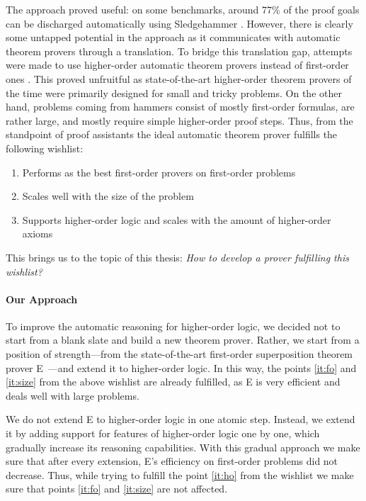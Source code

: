 The approach proved useful: on some benchmarks, around 77\% of the proof goals can be
discharged automatically using Sledgehammer \cite{bgkku-16-larning-fact-selector}. However, there is
clearly some untapped potential in the approach as it communicates with
automatic theorem provers through a translation. To bridge this translation gap,
attempts were made to use higher-order automatic theorem provers instead of
first-order ones \cite{ns-13-leo2sh}. This proved unfruitful as state-of-the-art
higher-order theorem provers of the time were primarily designed for small and
tricky problems. On the other hand, problems coming from hammers consist of
mostly first-order formulas, are rather large, and mostly require simple
higher-order proof steps. Thus, from the standpoint of proof assistants the ideal
automatic theorem prover fulfills the following wishlist:
\begin{enumerate}
  \item\label{it:fo} Performs as the best first-order provers on first-order problems
  \item\label{it:size} Scales well with the size of the problem
  \item\label{it:ho} Supports higher-order logic and scales with the amount of higher-order axioms
\end{enumerate}
This brings us to the topic of this thesis: \emph{How to develop a prover fulfilling this wishlist?}

\paragraph{Our Approach} To improve the automatic reasoning for higher-order
logic, we decided not to start from a blank slate and build a new theorem prover.
Rather, we start from a position of strength---from the state-of-the-art
first-order superposition theorem prover E~\cite{scv-19-e23}---and extend it to higher-order logic. In this way, the points \ref{it:fo} and
\ref{it:size} from the above wishlist are already fulfilled, as E is very
efficient and deals well with large problems.

We do not extend E to higher-order logic in one atomic step. Instead, we extend
it by adding support for features of higher-order logic one by one,
which gradually increase its reasoning capabilities. With this gradual
approach we make sure that after every extension, E's
efficiency on first-order problems did not decrease. Thus, while trying
to fulfill the point \ref{it:ho} from the wishlist we make sure that points
\ref{it:fo} and \ref{it:size} are not affected.

